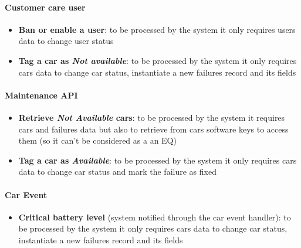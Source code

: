 \paragraph{Customer care user}
\begin{itemize}
	\item \textbf{Ban or enable a user}: to be processed by the system it only requires users data to change user status
	\item \textbf{Tag a car as \emph{Not available}}: to be processed by the system it only requires cars data to change car status, instantiate a new failures record and its fields
\end{itemize}

\paragraph{Maintenance API}
\begin{itemize}
	\item \textbf{Retrieve \emph{Not Available} cars}: to be processed by the system it requires cars and failures data but also to retrieve from cars software keys to access them (so it can't be considered as a an EQ)
	\item \textbf{Tag a car as \emph{Available}}: to be processed by the system it only requires cars data to change car status and mark the failure as fixed
\end{itemize}

\paragraph{Car Event}
\begin{itemize}
	\item \textbf{Critical battery level} (system notified through the car event handler): to be processed by the system it only requires cars data to change car status, instantiate a new failures record and its fields
\end{itemize}

